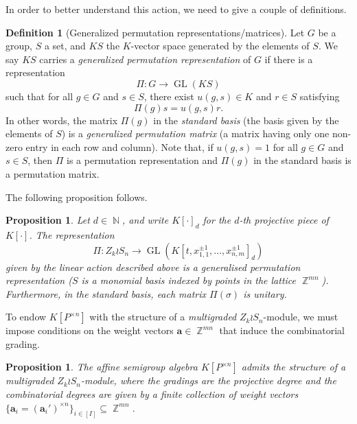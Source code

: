 \documentclass[a4paper,12pt]{amsart}
\theoremstyle{plain}
\newtheorem{proposition}[theorem]{Proposition}
\theoremstyle{definition}
\newtheorem{definition}[theorem]{Definition}
\theoremstyle{remark}
\DeclareMathOperator{\NN}{\mathbb{N}}
\DeclareMathOperator{\ZZ}{\mathbb{Z}}
\DeclareMathOperator{\GL}{GL}
\begin{document}
In order to better understand this action, we need to give a couple of definitions.

\begin{definition}[Generalized permutation representations/matrices]\label{definition:permutation-representation}
Let $G$ be a group, $S$ a set, and $KS$ the $K$-vector space generated by the elements of $S$. We say $KS$ carries a \emph{generalized permutation representation} of $G$ if there is a representation
\[
\Pi: G \rightarrow \GL(KS)
\]
such that for all $g \in G$ and $s \in S$, there exist $u(g, s) \in K$ and $r \in S$ satisfying
\[
\Pi(g)s = u(g, s)r.
\]
In other words, the matrix $\Pi(g)$ in the \emph{standard basis} (the basis given by the elements of $S$) is a \emph{generalized permutation matrix} (a matrix having only one non-zero entry in each row and column). Note that, if $u(g,s) = 1$ for all $g \in G$ and $s \in S$, then $\Pi$ is a permutation representation and $\Pi(g)$ in the standard basis is a permutation matrix.
\end{definition}

The following proposition follows.

\begin{proposition}\label{proposition:Pi-is-generalised-permutation-representation}
    Let $d \in \NN$, and write $K[\cdot]_d$ for the $d$-th projective piece of $K[\cdot]$. The representation
    \[
    \Pi: Z_k \wr S_n \to \GL(K[t, x_{1, 1}^{\pm 1}, \ldots, x_{n, m}^{\pm 1}]_d)
    \]
    given by the linear action described above is a generalised permutation representation ($S$ is a monomial basis indexed by points in the lattice $\ZZ^{mn}$). Furthermore, in the standard basis, each matrix $\Pi(\sigma)$ is unitary.
\end{proposition}

To endow $K[P^{\times n}]$ with the structure of a \emph{multigraded} $Z_k \wr S_n$-module, we must impose conditions on the weight vectors $\bm{a} \in \ZZ^{mn}$ that induce the combinatorial grading.

\begin{proposition}\label{proposition:kpn-is-multigraded-zk-sn-module}
    The affine semigroup algebra $K[P^{\times n}]$ admits the structure of a multigraded $Z_k \wr S_n$-module, where the gradings are the projective degree and the combinatorial degrees are given by a finite collection of weight vectors $\{\bm{a}_i = (\bm{a}_i')^{\times n}\}_{i \in [I]} \subseteq \ZZ^{mn}$.
\end{proposition}
\end{document}
